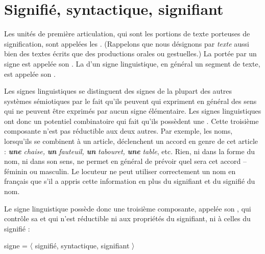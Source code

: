 \section{Signifié, syntactique, signifiant}\label{sec:2.1.3}

{Les unités de première articulation, qui sont les portions de texte porteuses de signification, sont appelées les . (Rappelons que nous désignons par \textit{texte} aussi bien des textes écrits que des productions orales ou gestuelles.) La  portée par un signe est appelée son . La  d’un signe linguistique, en général un segment de texte, est appelée son .}

Les signes linguistiques se distinguent des signes de la plupart des autres systèmes sémiotiques par le fait qu’ils peuvent  qui expriment en général des sens qui ne peuvent être exprimés par aucun signe élémentaire. Les signes linguistiques ont donc un potentiel combinatoire qui fait qu’ils possèdent une . Cette troisième composante n’est pas réductible aux deux autres. Par exemple, les noms, lorsqu’ils se combinent à un article, déclenchent un accord en genre de cet article : \textbf{\textit{une}} \textit{chaise,} \textbf{\textit{un}} \textit{fauteuil,} \textbf{\textit{un}} \textit{tabouret,} \textbf{\textit{une}} \textit{table}, etc. Rien, ni dans la forme du nom, ni dans son sens, ne permet en général de prévoir quel sera cet accord – féminin ou masculin. Le locuteur ne peut utiliser correctement un nom en français que s’il a appris cette information en plus du signifiant et du signifié du nom.

{Le signe linguistique possède donc une troisième composante, appelée son , qui contrôle sa  et qui n’est réductible ni aux propriétés du signifiant, ni à celles du signifié :

\begin{center} signe = 〈 signifié, syntactique, signifiant 〉\end{center}}

